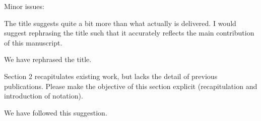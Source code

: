\documentclass[12pt]{article}
\newcommand{\revtext}{\textsf}
\begin{document}
\revtext{Minor issues:}

\revtext{The title suggests quite a bit more than what actually is delivered. I would suggest rephrasing the title such that it accurately reflects the main contribution of this manuscript.}

We have rephrased the title.

\revtext{Section 2 recapitulates existing work, but lacks the detail of previous publications. Please make the objective of this section explicit (recapitulation and introduction of notation).}

We have followed this suggestion.
\end{document}

